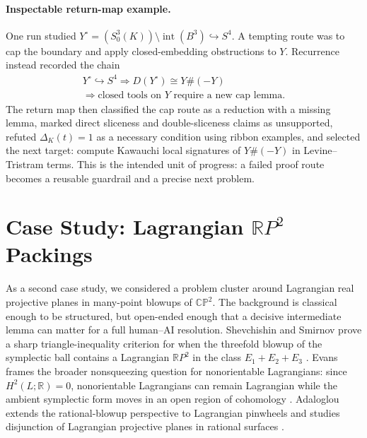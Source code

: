 \documentclass{article}
\theoremstyle{definition}
\theoremstyle{remark}
\begin{document}
\paragraph{Inspectable return-map example.}
One run studied \(Y^\circ=(S^3_0(K))\setminus\operatorname{int}(B^3)\hookrightarrow S^4\). A tempting route was to cap the boundary and apply closed-embedding obstructions to \(Y\). Recurrence instead recorded the chain
\[
\begin{gathered}
Y^\circ\hookrightarrow S^4
\Rightarrow D(Y^\circ)\cong Y\#(-Y)\\
\Rightarrow \text{closed tools on }Y
\text{ require a new cap lemma}.
\end{gathered}
\]
The return map then classified the cap route as a reduction with a missing lemma, marked direct sliceness and double-sliceness claims as unsupported, refuted \(\Delta_K(t)=1\) as a necessary condition using ribbon examples, and selected the next target: compute Kawauchi local signatures of \(Y\#(-Y)\) in Levine--Tristram terms. This is the intended unit of progress: a failed proof route becomes a reusable guardrail and a precise next problem.

\section{Case Study: Lagrangian \texorpdfstring{\(\mathbb{R}P^2\)}{RP2} Packings}
\label{sec:rp2}

As a second case study, we considered a problem cluster around Lagrangian real projective planes in many-point blowups of \(\mathbb{CP}^2\). The background is classical enough to be structured, but open-ended enough that a decisive intermediate lemma can matter for a full human--AI resolution. Shevchishin and Smirnov prove a sharp triangle-inequality criterion for when the threefold blowup of the symplectic ball contains a Lagrangian \(\mathbb{R}P^2\) in the class \(E_1+E_2+E_3\) \citep{shevchishin2020triangle}. Evans frames the broader nonsqueezing question for nonorientable Lagrangians: since \(H^2(L;\mathbb{R})=0\), nonorientable Lagrangians can remain Lagrangian while the ambient symplectic form moves in an open region of cohomology \citep{evans2022klein}. Adaloglou extends the rational-blowup perspective to Lagrangian pinwheels and studies disjunction of Lagrangian projective planes in rational surfaces \citep{adaloglou2024pinwheels}.
\end{document}
